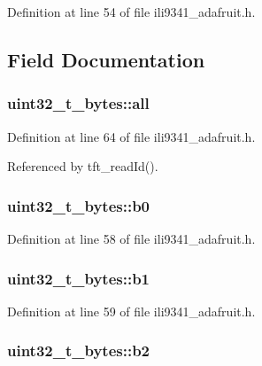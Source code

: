 Definition at line 54 of file ili9341\-\_\-adafruit.\-h.



\subsection{Field Documentation}
\hypertarget{unionuint32__t__bytes_a83b0c87830b60d185365dbadf8efd4a0}{
\subsubsection[{all}]{ uint32\-\_\-t\-\_\-bytes\-::all}}\label{unionuint32__t__bytes_a83b0c87830b60d185365dbadf8efd4a0}


Definition at line 64 of file ili9341\-\_\-adafruit.\-h.



Referenced by tft\-\_\-read\-Id().

\hypertarget{unionuint32__t__bytes_a92b86537decb69327191d870f41c60f7}{
\subsubsection[{b0}]{ uint32\-\_\-t\-\_\-bytes\-::b0}}\label{unionuint32__t__bytes_a92b86537decb69327191d870f41c60f7}


Definition at line 58 of file ili9341\-\_\-adafruit.\-h.

\hypertarget{unionuint32__t__bytes_a91fb31482a2ce44b454fca964dcd556b}{
\subsubsection[{b1}]{ uint32\-\_\-t\-\_\-bytes\-::b1}}\label{unionuint32__t__bytes_a91fb31482a2ce44b454fca964dcd556b}


Definition at line 59 of file ili9341\-\_\-adafruit.\-h.

\hypertarget{unionuint32__t__bytes_a462312b99de0c6d1c497064902196e1d}{
\subsubsection[{b2}]{ uint32\-\_\-t\-\_\-bytes\-::b2}}\label{unionuint32__t__bytes_a462312b99de0c6d1c497064902196e1d}


